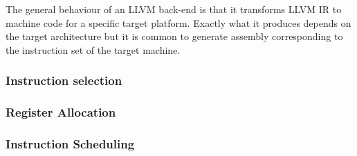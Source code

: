 The general behaviour of an LLVM back-end is that it transforms LLVM IR to machine code
for a specific target platform. Exactly what it produces depends on the target architecture
but it is common to generate assembly corresponding to the instruction set of the target
machine.

\subsubsection{Instruction selection}


\subsubsection{Register Allocation}

\subsubsection{Instruction Scheduling}
